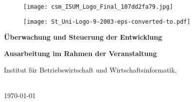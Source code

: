 
\newcommand{\untertitel}{Überwachung und Steuerung der Entwicklung} 

%
%

\begin{titlepage}
	\begin{figure}
		\centering
		\begin{minipage}{0.28\textwidth}
			\begin{flushleft}
				\texttt{[image: csm\_ISUM\_Logo\_Final\_107dd2fa79.jpg]}
			\end{flushleft}
		\end{minipage}
		\begin{minipage}{0.35\textwidth}
			\centering
			\hspace{0.25cm}
		\end{minipage}
		\begin{minipage}{0.25\textwidth}
			\begin{flushright}
				\texttt{[image: St\_Uni-Logo-9-2003-eps-converted-to.pdf]}
			\end{flushright}
		\end{minipage}
		\vspace{4cm}
	\end{figure}
	\begin{center}
		
		\Huge{\textbf{\titel}}
		
		\Huge{\textbf{\untertitel}}
		\vspace{2cm}
	\end{center}
	\begin{center}
		\vspace*{0cm}
		\textbf{Ausarbeitung im Rahmen der Veranstaltung \veranstaltung}
		\vspace{1cm}
	\end{center}
	\begin{center}
		Institut für Betriebswirtschaft und Wirtschaftsinformatik,
		
		\arbeitsgruppe
	\end{center}
	\begin{center}
		\vspace{4cm}
		\autor\\
		

		\today
	\end{center}
\end{titlepage}
\newpage

